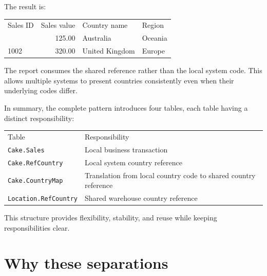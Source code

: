 \documentclass[10pt,openany,10pt]{book}
\newcounter{none}
\let\podeToprule\toprule
\let\podeMidrule\midrule
\let\podeBottomrule\bottomrule
\renewcommand{\toprule}{\arrayrulecolor{pbiGrid}\podeToprule}
\renewcommand{\midrule}{\arrayrulecolor{pbiGrid}\podeMidrule}
\renewcommand{\bottomrule}{\arrayrulecolor{pbiGrid}\podeBottomrule}
\begin{document}
The result is:

{\def\LTcaptype{none} %
\begin{longtable}[]{@{}lrll@{}}
\toprule\noalign{}
Sales ID & Sales value & Country name & Region \\
\midrule\noalign{}
\endhead
\bottomrule\noalign{}
\endlastfoot
1001 & 125.00 & Australia & Oceania \\
1002 & 320.00 & United Kingdom & Europe \\
\end{longtable}
}

The report consumes the shared reference rather than the local system
code. This allows multiple systems to present countries consistently
even when their underlying codes differ.

In summary, the complete pattern introduces four tables, each table
having a distinct responsibility:

{\def\LTcaptype{none} %
\begin{longtable}[]{@{}
  >{\raggedright\arraybackslash}p{}
  >{\raggedright\arraybackslash}p{}@{}}
\toprule\noalign{}
\begin{minipage}[b]{\linewidth}\raggedright
Table
\end{minipage} & \begin{minipage}[b]{\linewidth}\raggedright
Responsibility
\end{minipage} \\
\midrule\noalign{}
\endhead
\bottomrule\noalign{}
\endlastfoot
\texttt{Cake.Sales} & Local business transaction \\
\texttt{Cake.RefCountry} & Local system country reference \\
\texttt{Cake.CountryMap} & Translation from local country code to shared
country reference \\
\texttt{Location.RefCountry} & Shared warehouse country reference \\
\end{longtable}
}

This structure provides flexibility, stability, and reuse while keeping
responsibilities clear.

\section{Why these separations}\label{why-these-separations}
\end{document}
